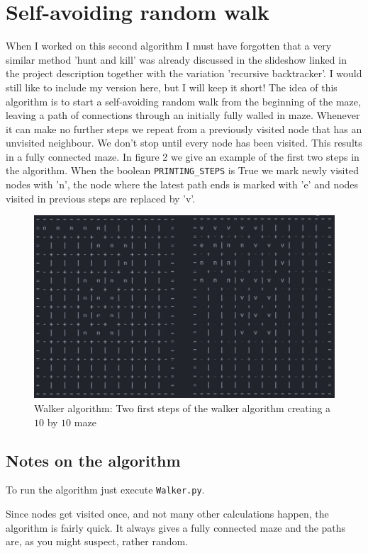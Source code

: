 \documentclass[10pt, a4paper, twoside]{amsart}
\newcommand{\1}{\mathbbm{1}}
\begin{document}
\section{Self-avoiding random walk}
When I worked on this second algorithm I must have forgotten that a very similar method 'hunt and kill' was already discussed in the slideshow linked in the project description together with the variation 'recursive backtracker'. I would still like to include my version here, but I will keep it short!
The idea of this algorithm is to start a self-avoiding random walk from the beginning of the maze, leaving a path of connections through an initially fully walled in maze. Whenever it can make no further steps we repeat from a previously visited node that has an unvisited neighbour. We don't stop until every node has been visited. This results in a fully connected maze. In figure 2 we give an example of the first two steps in the algorithm. When the boolean \verb+PRINTING_STEPS+ is True we mark newly visited nodes with 'n', the node where the latest path ends is marked with 'e' and nodes visited in previous steps are replaced by 'v'.

\begin{figure}
\centering
        \includegraphics[totalheight=8cm]{beginwalker}
    \caption{Walker algorithm: Two first steps of the walker algorithm creating a $10$ by $10$ maze}
\end{figure}


\subsection*{Notes on the algorithm}
To run the algorithm just execute \verb+Walker.py+.

Since nodes get visited once, and not many other calculations happen, the algorithm is fairly quick. It always gives a fully connected maze and the paths are, as you might suspect, rather random.
\end{document}

